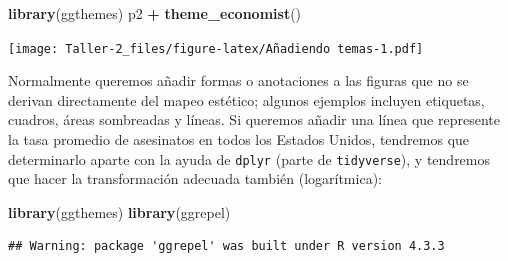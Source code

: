 \documentclass[
]{article}
\newenvironment{Shaded}{\begin{snugshade}}{\end{snugshade}}
\newcommand{\FunctionTok}[1]{\textcolor[rgb]{0.13,0.29,0.53}{\textbf{#1}}}
\newcommand{\NormalTok}[1]{#1}
\newcommand{\SpecialCharTok}[1]{\textcolor[rgb]{0.81,0.36,0.00}{\textbf{#1}}}
\begin{document}
\begin{Shaded}
\begin{Highlighting}[]
\FunctionTok{library}\NormalTok{(ggthemes)}
\NormalTok{p2 }\SpecialCharTok{+} \FunctionTok{theme\_economist}\NormalTok{()}
\end{Highlighting}
\end{Shaded}

\texttt{[image: Taller-2\_files/figure-latex/Añadiendo temas-1.pdf]}

Normalmente queremos añadir formas o anotaciones a las figuras que no se
derivan directamente del mapeo estético; algunos ejemplos incluyen
etiquetas, cuadros, áreas sombreadas y líneas. Si queremos añadir una
línea que represente la tasa promedio de asesinatos en todos los Estados
Unidos, tendremos que determinarlo aparte con la ayuda de \texttt{dplyr}
(parte de \texttt{tidyverse}), y tendremos que hacer la transformación
adecuada también (logarítmica):

\begin{Shaded}
\begin{Highlighting}[]
\FunctionTok{library}\NormalTok{(ggthemes)}
\FunctionTok{library}\NormalTok{(ggrepel)}
\end{Highlighting}
\end{Shaded}

\begin{verbatim}
## Warning: package 'ggrepel' was built under R version 4.3.3
\end{verbatim}
\end{document}
